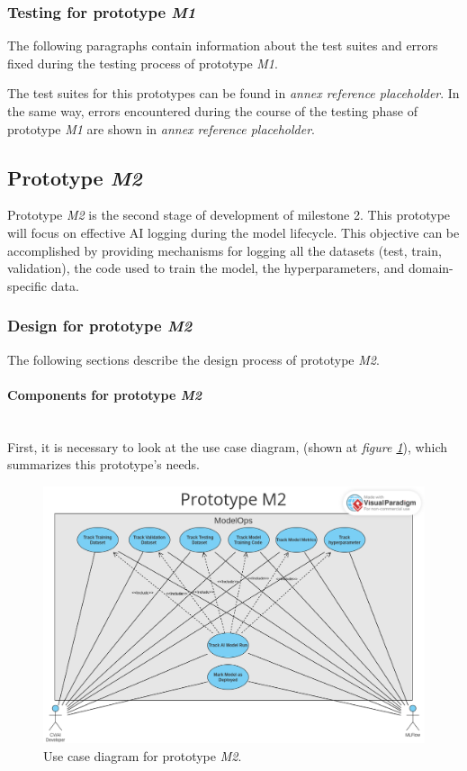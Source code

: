\subsubsection{Testing for prototype \emph{M1}}

The following paragraphs contain information about the test suites and errors fixed during the testing process of prototype \emph{M1}.

The test suites for this prototypes can be found in \emph{annex reference placeholder}. %
In the same way, errors encountered during the course of the testing phase of prototype \emph{M1} are shown in \emph{annex reference placeholder}. %

\subsection{Prototype \emph{M2}}

Prototype \emph{M2} is the second stage of development of milestone 2. This prototype will focus on effective \acrshort{AI} logging during the model lifecycle. 
This objective can be accomplished by providing mechanisms for logging all 
the datasets (test, train, validation), the code used to train the model, the hyperparameters, and domain-specific data.

\subsubsection{Design for prototype \emph{M2}}

The following sections describe the design process of prototype \emph{M2}.

\paragraph{Components for prototype \emph{M2}} \mbox{}\\

First, it is necessary to look at the use case diagram, (shown at \emph{figure \ref{fig:useCaseM2}}), which summarizes this prototype's needs.

\begin{figure}[H]
    \centering
    \includegraphics[width=0.7\linewidth]{figs/use-case-M2.png}
    \caption{Use case diagram for prototype \emph{M2}.}
    \label{fig:useCaseM2}
\end{figure}

